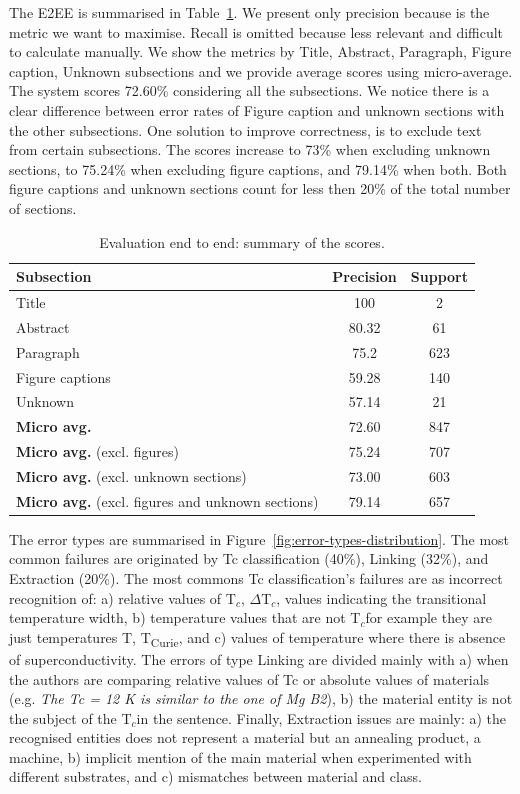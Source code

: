 \documentclass{article}
\newcommand{\tc}{T$_{c}$}
\begin{document}
The E2EE is summarised in Table~\ref{table:end2end-evaluation-summary}. 
We present only precision because is the metric we want to maximise. Recall is omitted because less relevant and difficult to calculate manually. 
We show the metrics by Title, Abstract, Paragraph, Figure caption, Unknown subsections and we provide average scores using micro-average. 
The system scores 72.60\% considering all the subsections. 
We notice there is a clear difference between error rates of Figure caption and unknown sections with the other subsections. 
One solution to improve correctness, is to exclude text from certain subsections. 
The scores increase to 73\% when excluding unknown sections, to 75.24\% when excluding figure captions, and 79.14\%  when both. 
Both figure captions and unknown sections count for less then 20\% of the total number of sections. 

\begin{table}[ht]
\centering
\begin{tabular}{l c c}
\hline \textbf{Subsection} & \textbf{Precision} & \textbf{Support} \\ 
\hline
Title               & 100       & 2     \\
Abstract            & 80.32     & 61    \\
Paragraph           & 75.2      & 623   \\    
Figure captions     & 59.28     & 140   \\    
Unknown             & 57.14     & 21    \\
\hline
\hline
\textbf{Micro avg.}  & 72.60     & 847   \\
\textbf{Micro avg.} (excl. figures)  & 75.24     & 707   \\ 
\textbf{Micro avg.} (excl. unknown sections)  & 73.00     & 603   \\ 
\textbf{Micro avg.} (excl. figures and unknown sections)  & 79.14     & 657   \\ 
\hline
\end{tabular}
\caption{Evaluation end to end: summary of the scores. }
\label{table:end2end-evaluation-summary}
\end{table}

The error types are summarised in Figure~\ref{fig:error-types-distribution}. The most common failures are originated by Tc classification (40\%), Linking (32\%), and Extraction (20\%).
The most commons Tc classification's failures are as incorrect recognition of: a) relative values of \tc, $\Delta$\tc, values indicating the transitional temperature width,  b) temperature values that are not \tc for example they are just temperatures T, T\textsubscript{Curie}, and c) values of temperature where there is absence of superconductivity.
The errors of type Linking are divided mainly with a) when the authors are comparing relative values of Tc or absolute values of materials (e.g. \textit{The Tc = 12 K is similar to the one of Mg B2}), b) the material entity is not the subject of the \tc  in the sentence. 
Finally, Extraction issues are mainly: a) the recognised entities does not represent a material but an annealing product, a machine, b) implicit mention of the main material when experimented with different substrates, and c) mismatches between material and class. 
\end{document}
